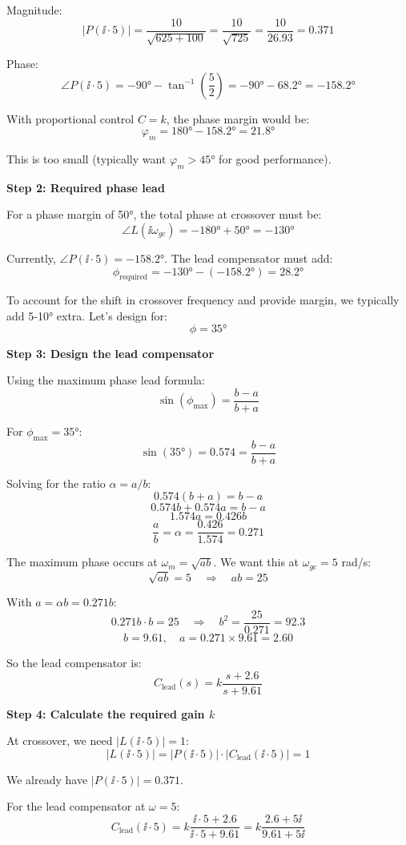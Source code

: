 \documentclass[11pt,a4paper]{article}
\begin{document}
Magnitude:
\[
|P(\ii \cdot 5)| = \frac{10}{\sqrt{625 + 100}} = \frac{10}{\sqrt{725}} = \frac{10}{26.93} = 0.371
\]

Phase:
\[
\angle P(\ii \cdot 5) = -90° - \tan^{-1}\left(\frac{5}{2}\right) = -90° - 68.2° = -158.2°
\]

With proportional control $C = k$, the phase margin would be:
\[
\varphi_m = 180° - 158.2° = 21.8°
\]

This is too small (typically want $\varphi_m > 45°$ for good performance).

\textbf{Step 2: Required phase lead}

For a phase margin of 50°, the total phase at crossover must be:
\[
\angle L(\ii\omega_{gc}) = -180° + 50° = -130°
\]

Currently, $\angle P(\ii \cdot 5) = -158.2°$. The lead compensator must add:
\[
\phi_{\text{required}} = -130° - (-158.2°) = 28.2°
\]

To account for the shift in crossover frequency and provide margin, we typically add 5-10° extra. Let's design for:
\[
\phi = 35°
\]

\textbf{Step 3: Design the lead compensator}

Using the maximum phase lead formula:
\[
\sin(\phi_{\max}) = \frac{b - a}{b + a}
\]

For $\phi_{\max} = 35°$:
\[
\sin(35°) = 0.574 = \frac{b - a}{b + a}
\]

Solving for the ratio $\alpha = a/b$:
\[
0.574(b + a) = b - a
\]
\[
0.574b + 0.574a = b - a
\]
\[
1.574a = 0.426b
\]
\[
\frac{a}{b} = \alpha = \frac{0.426}{1.574} = 0.271
\]

The maximum phase occurs at $\omega_m = \sqrt{ab}$. We want this at $\omega_{gc} = 5$ rad/s:
\[
\sqrt{ab} = 5 \quad \Rightarrow \quad ab = 25
\]

With $a = \alpha b = 0.271b$:
\[
0.271b \cdot b = 25 \quad \Rightarrow \quad b^2 = \frac{25}{0.271} = 92.3
\]
\[
b = 9.61, \quad a = 0.271 \times 9.61 = 2.60
\]

So the lead compensator is:
\[
C_{\text{lead}}(s) = k\frac{s + 2.6}{s + 9.61}
\]

\textbf{Step 4: Calculate the required gain $k$}

At crossover, we need $|L(\ii \cdot 5)| = 1$:
\[
|L(\ii \cdot 5)| = |P(\ii \cdot 5)| \cdot |C_{\text{lead}}(\ii \cdot 5)| = 1
\]

We already have $|P(\ii \cdot 5)| = 0.371$.

For the lead compensator at $\omega = 5$:
\[
C_{\text{lead}}(\ii \cdot 5) = k\frac{\ii \cdot 5 + 2.6}{\ii \cdot 5 + 9.61} = k\frac{2.6 + 5\ii}{9.61 + 5\ii}
\]
\end{document}
